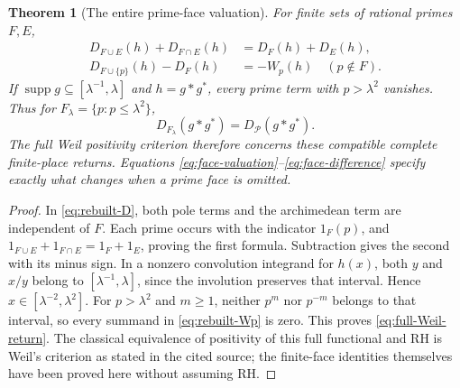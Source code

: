 \documentclass[11pt,a4paper]{article}
\newtheorem{theorem}{Theorem}[section]
\theoremstyle{definition}\newtheorem{definition}[theorem]{Definition}
\newcommand{\supp}{\operatorname{supp}}\newcommand{\tr}{\operatorname{tr}}
\begin{document}
\begin{theorem}[The entire prime-face valuation]\label{thm:prime-face-weil}
For finite sets of rational primes $F,E$,
\begin{align}
 D_{F\cup E}(h)+D_{F\cap E}(h)&=D_F(h)+D_E(h),\label{eq:face-valuation}\\
 D_{F\cup\{p\}}(h)-D_F(h)&=-W_p(h)\quad(p\notin F).
 \label{eq:face-difference}
\end{align}
If $\supp g\subseteq[\lambda^{-1},\lambda]$ and $h=g*g^*$, every prime term with $p>\lambda^2$ vanishes. Thus for $F_\lambda=\{p:p\le\lambda^2\}$,
\begin{equation}\label{eq:full-Weil-return}
 D_{F_\lambda}(g*g^*)=D_{\mathcal P}(g*g^*).
\end{equation}
The full Weil positivity criterion therefore concerns these compatible complete finite-place returns. Equations \eqref{eq:face-valuation}--\eqref{eq:face-difference} specify exactly what changes when a prime face is omitted.
\end{theorem}
\begin{proof}
In \eqref{eq:rebuilt-D}, both pole terms and the archimedean term are independent of $F$. Each prime occurs with the indicator $1_F(p)$, and
$1_{F\cup E}+1_{F\cap E}=1_F+1_E$, proving the first formula. Subtraction gives the second with its minus sign. In a nonzero convolution integrand for $h(x)$, both $y$ and $x/y$ belong to $[\lambda^{-1},\lambda]$, since the involution preserves that interval. Hence $x\in[\lambda^{-2},\lambda^2]$. For $p>\lambda^2$ and $m\ge1$, neither $p^m$ nor $p^{-m}$ belongs to that interval, so every summand in \eqref{eq:rebuilt-Wp} is zero. This proves \eqref{eq:full-Weil-return}. The classical equivalence of positivity of this full functional and RH is Weil's criterion as stated in the cited source; the finite-face identities themselves have been proved here without assuming RH.
\end{proof}
\end{document}
